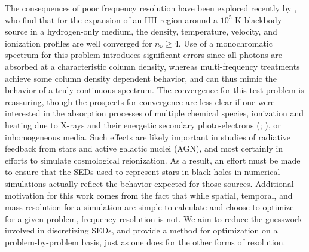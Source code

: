 \documentclass[preprint2]{aastex}              %
\begin{document}
The consequences of poor frequency resolution have been explored recently by \cite{Wise2011}, who find that for the expansion of an HII region around a $10^5$ K blackbody source in a hydrogen-only medium, the density, temperature, velocity, and ionization profiles are well converged for $n_{\nu} \ge 4$.  Use of a monochromatic spectrum for this problem introduces significant errors since all photons are absorbed at a characteristic column density, whereas multi-frequency treatments achieve some column density dependent behavior, and can thus mimic the behavior of a truly continuous spectrum.  The convergence for this test problem is reassuring, though the prospects for convergence are less clear if one were interested in the absorption processes of multiple chemical species, ionization and heating due to X-rays and their energetic secondary photo-electrons (\cite{Shull1985}; \cite{Furlanetto2010}), or inhomogeneous media.  Such effects are likely important in studies of radiative feedback from stars and active galactic nuclei (AGN), and most certainly in efforts to simulate cosmological reionization.  As a result, an effort must be made to ensure that the SEDs used to represent stars in black holes in numerical simulations actually reflect the behavior expected for those sources.  Additional motivation for this work comes from the fact that while spatial, temporal, and mass resolution for a simulation are simple to calculate and choose to optimize for a given problem, frequency resolution is not.  We aim to reduce the guesswork involved in discretizing SEDs, and provide a method for optimization on a problem-by-problem basis, just as one does for the other forms of resolution.
\end{document}
